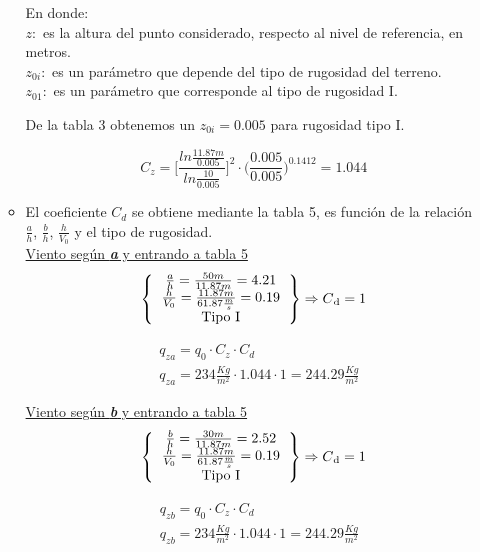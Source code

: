 \begin{enumerate}
\begin{itemize}
En donde:\\
$z:$ es la altura del punto considerado, respecto al nivel de referencia, en metros.\\
$z_{0i}:$ es un parámetro que depende del tipo de rugosidad del terreno.\\
$z_{01}:$ es un parámetro que corresponde al tipo de rugosidad I.\\

\newpage

De la tabla 3 obtenemos un $z_{0i}=0.005$ para rugosidad tipo I.

$$C_z= \Bigg[\frac{ln\frac{11.87m}{0.005}} {ln\frac{10}{0.005}}\Bigg]^2 \cdot \Bigg(\frac{0.005}{0.005}\Bigg)^{0.1412} = 1.044$$

\item El coeficiente $C_d$ se obtiene mediante la tabla 5, es función de la relación $\frac{a}{h}$, $\frac{b}{h}$, $\frac{h}{V_0}$ y el tipo de rugosidad.\\

\underline{Viento según \emph{\textbf{a}} y entrando a tabla 5}
\[ 
\left \{
  \begin{tabular}{ccc}
  $\frac{a}{h} = \frac{50m}{11.87m} = 4.21$ \\
  $\frac{h}{V_0} = \frac{11.87m}{61.87 \frac{m}{s}} = 0.19$ \\
  Tipo I
  \end{tabular}
\right \} \Rightarrow C\textsubscript{d} = 1
\]

\begin{align*}
& q_{za}= q_0 \cdot C_z \cdot C_d \\
& q_{za}= 234 \frac{Kg}{m^2} \cdot 1.044 \cdot 1 = 244.29 \frac{Kg}{m^2}
\end{align*}

\underline{Viento según \emph{\textbf{b}} y entrando a tabla 5}
\[ 
\left \{
  \begin{tabular}{ccc}
  $\frac{b}{h} = \frac{30m}{11.87m} = 2.52$ \\
  $\frac{h}{V_0} = \frac{11.87m}{61.87 \frac{m}{s}} = 0.19$ \\
  Tipo I
  \end{tabular}
\right \} \Rightarrow C\textsubscript{d} = 1
\]

\begin{align*}
& q_{zb}= q_0 \cdot C_z \cdot C_d \\
& q_{zb}= 234 \frac{Kg}{m^2} \cdot 1.044 \cdot 1 = 244.29 \frac{Kg}{m^2}
\end{align*}


\end{itemize}
\end{enumerate}
